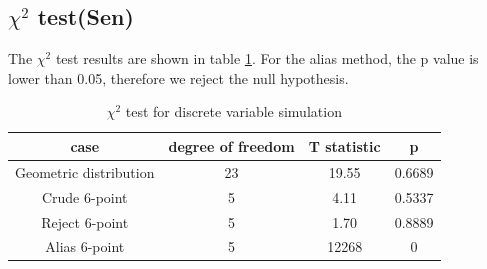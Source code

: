\subsection*{$\chi^2$ test(Sen)}
The $\chi^2$ test results are shown in table \ref{tab:discreteTest}. For the alias method, the p value is lower than 0.05, therefore we reject the null hypothesis.
\begin{table}[h]
    \centering
    \begin{tabular}{|c|c|c|c|}
    \hline 
    case & degree of freedom & T statistic & p \\ \hline
      Geometric distribution  &  23 & 19.55 & 0.6689\\  \hline
      Crude 6-point   & 5 &4.11& 0.5337\\ \hline
      Reject 6-point &5 & 1.70 & 0.8889\\ \hline
      Alias 6-point & 5 & 12268 & 0\\ \hline
    \end{tabular}
    \caption{$\chi^2$ test for discrete variable simulation}
    \label{tab:discreteTest}
\end{table}
